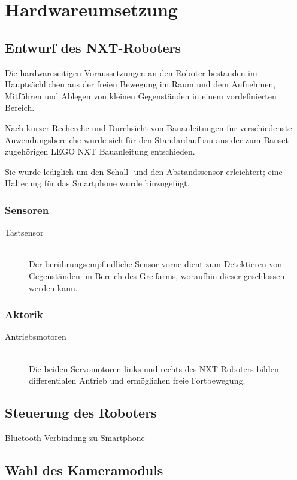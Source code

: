 \chapter{Hardwareumsetzung}
\section{Entwurf des NXT-Roboters}

Die hardwareseitigen Voraussetzungen an den Roboter bestanden im Hauptsächlichen aus der freien Bewegung im Raum und dem Aufnehmen, Mitführen und Ablegen von kleinen Gegenständen in einem vordefinierten Bereich.

Nach kurzer Recherche\cite{building_instructions} und Durchsicht von Bauanleitungen für verschiedenste Anwendungsbereiche wurde sich für den Standardaufbau aus der zum Bauset zugehörigen LEGO NXT Bauanleitung entschieden.

Sie wurde lediglich um den Schall- und den Abstandssensor erleichtert; eine Halterung für das Smartphone wurde hinzugefügt.


\subsection{Sensoren}

\begin{description}
\item[Tastsensor]\hfill \\
Der berührungsempfindliche Sensor vorne dient zum Detektieren von Gegenständen im Bereich des Greifarms, woraufhin dieser geschlossen werden kann.
\end{description}

\subsection{Aktorik}

\begin{description}
\item[Antriebsmotoren]\hfill \\
Die beiden Servomotoren links und rechts des NXT-Roboters bilden differentialen Antrieb und ermöglichen freie Fortbewegung.
\end{description}

\section{Steuerung des Roboters}
Bluetooth Verbindung zu Smartphone

\section{Wahl des Kameramoduls}
\label{sec:Kamera}
